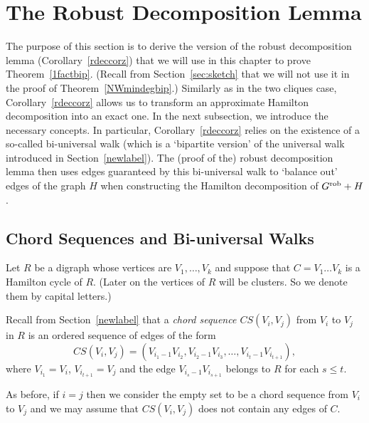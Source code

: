 \documentclass{memo-l}
\numberwithin{section}{chapter}
\numberwithin{equation}{section}
\numberwithin{firstthm}{section}
\numberwithin{figure}{section}
\begin{document}
{\section{The Robust Decomposition Lemma}\label{sec:robust}
The purpose of this section is to derive the version of the robust decomposition lemma (Corollary~\ref{rdeccorz}) that we will use
in this chapter to prove Theorem~\ref{1factbip}. (Recall from Section~\ref{sec:sketch} that we will not use it in the proof of Theorem~\ref{NWmindegbip}.)
Similarly as in the two cliques case, 
Corollary~\ref{rdeccorz} allows us to transform an approximate Hamilton decomposition into an exact one.
In the next subsection, we introduce the necessary concepts. In particular, Corollary~\ref{rdeccorz} relies on the existence of a
so-called bi-universal walk (which is a `bipartite version' of the universal walk introduced in Section~\ref{newlabel}).
The (proof of the) robust decomposition lemma then uses
edges guaranteed by this bi-universal walk to `balance out' edges of the graph $H$ when constructing the Hamilton decomposition of
$G^{\rm rob}+H$.
\subsection{Chord Sequences and Bi-universal Walks}
Let $R$ be a digraph whose vertices are $V_1,\dots,V_k$ and suppose that $C=V_1\dots V_k$ is a Hamilton cycle of $R$.
(Later on the vertices of $R$ will be clusters. So we denote them by capital letters.)

Recall from Section~\ref{newlabel} that a  \emph{chord sequence $CS(V_i,V_j)$} from $V_i$ to $V_j$ in $R$ is an ordered sequence of edges of the form
\[ CS(V_i,V_j) = (V_{i_1-1} V_{i_2}, V_{i_2-1} V_{i_3},\dots, V_{i_t-1} V_{i_{t+1}}),\]
where $V_{i_1}=V_i$, $V_{i_{t+1}} = V_j$ and the edge $V_{i_s-1} V_{i_{s+1}}$ belongs to $R$ for each $s\le t$.


As before, if $i=j$ then we consider the empty set to be a chord sequence from $V_i$ to $V_j$
and  we may assume that $CS(V_i,V_j)$ does not contain any edges of $C$.


}
\end{document}
